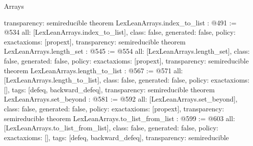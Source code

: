 \begin{lexlean}{Arrays}
\begin{coremodule}
{  transparency: semireducible
}
theorem LexLeanArrays.index_to_list : @491 := @534 {
  all: [LexLeanArrays.index_to_list],
  class: false,
  generated: false,
  policy: exact{axioms: [propext]},
  transparency: semireducible
}
theorem LexLeanArrays.length_set : @545 := @554 {
  all: [LexLeanArrays.length_set],
  class: false,
  generated: false,
  policy: exact{axioms: [propext]},
  transparency: semireducible
}
theorem LexLeanArrays.length_to_list : @567 := @571 {
  all: [LexLeanArrays.length_to_list],
  class: false,
  generated: false,
  policy: exact{axioms: []},
  tags: [defeq, backward_defeq],
  transparency: semireducible
}
theorem LexLeanArrays.set_beyond : @581 := @592 {
  all: [LexLeanArrays.set_beyond],
  class: false,
  generated: false,
  policy: exact{axioms: [propext]},
  transparency: semireducible
}
theorem LexLeanArrays.to_list_from_list : @599 := @603 {
  all: [LexLeanArrays.to_list_from_list],
  class: false,
  generated: false,
  policy: exact{axioms: []},
  tags: [defeq, backward_defeq],
  transparency: semireducible
}


\end{coremodule}
\end{lexlean}
